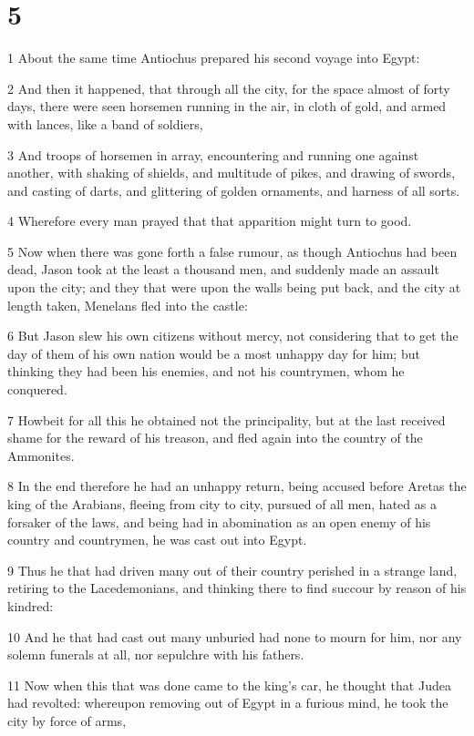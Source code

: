 \chapter{5}

\par 1 About the same time Antiochus prepared his second voyage into Egypt:
\par 2 And then it happened, that through all the city, for the space almost of forty days, there were seen horsemen running in the air, in cloth of gold, and armed with lances, like a band of soldiers,
\par 3 And troops of horsemen in array, encountering and running one against another, with shaking of shields, and multitude of pikes, and drawing of swords, and casting of darts, and glittering of golden ornaments, and harness of all sorts.
\par 4 Wherefore every man prayed that that apparition might turn to good.
\par 5 Now when there was gone forth a false rumour, as though Antiochus had been dead, Jason took at the least a thousand men, and suddenly made an assault upon the city; and they that were upon the walls being put back, and the city at length taken, Menelans fled into the castle:
\par 6 But Jason slew his own citizens without mercy, not considering that to get the day of them of his own nation would be a most unhappy day for him; but thinking they had been his enemies, and not his countrymen, whom he conquered.
\par 7 Howbeit for all this he obtained not the principality, but at the last received shame for the reward of his treason, and fled again into the country of the Ammonites.
\par 8 In the end therefore he had an unhappy return, being accused before Aretas the king of the Arabians, fleeing from city to city, pursued of all men, hated as a forsaker of the laws, and being had in abomination as an open enemy of his country and countrymen, he was cast out into Egypt.
\par 9 Thus he that had driven many out of their country perished in a strange land, retiring to the Lacedemonians, and thinking there to find succour by reason of his kindred:
\par 10 And he that had cast out many unburied had none to mourn for him, nor any solemn funerals at all, nor sepulchre with his fathers.
\par 11 Now when this that was done came to the king's car, he thought that Judea had revolted: whereupon removing out of Egypt in a furious mind, he took the city by force of arms,
